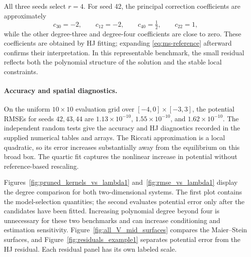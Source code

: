 \documentclass[11pt]{article}
\theoremstyle{plain}      %
\theoremstyle{definition} %
\begin{document}
All three seeds select $r=4$. For seed 42, the principal correction coefficients are approximately
\[
 c_{30}=-2,\qquad c_{12}=-2,\qquad c_{40}=\tfrac12,\qquad c_{22}=1,
\]
while the other degree-three and degree-four coefficients are close to zero. These coefficients are obtained by HJ fitting; expanding \eqref{eq:ms-reference} afterward confirms their interpretation. In this representable benchmark, the small residual reflects both the polynomial structure of the solution and the stable local constraints.

\paragraph{Accuracy and spatial diagnostics.}
On the uniform $10\times10$ evaluation grid over $[-4,0]\times[-3,3]$, the potential RMSEs for seeds $42,43,44$ are $1.13\times10^{-10}$, $1.55\times10^{-10}$, and $1.62\times10^{-10}$. The independent random tests give the accuracy and HJ diagnostics recorded in the supplied numerical tables and arrays. The Riccati approximation is a local quadratic, so its error increases substantially away from the equilibrium on this broad box. The quartic fit captures the nonlinear increase in potential without reference-based rescaling.

Figures~\ref{fig:pruned_kernels_vs_lambda1} and~\ref{fig:rmse_vs_lambda1} display the degree comparison for both two-dimensional systems. The first plot contains the model-selection quantities; the second evaluates potential error only after the candidates have been fitted. Increasing polynomial degree beyond four is unnecessary for these two benchmarks and can increase conditioning and estimation sensitivity. Figure~\ref{fig:all_V_mid_surfaces} compares the Maier--Stein surfaces, and Figure~\ref{fig:residuals_example1} separates potential error from the HJ residual. Each residual panel has its own labeled scale.
\end{document}
